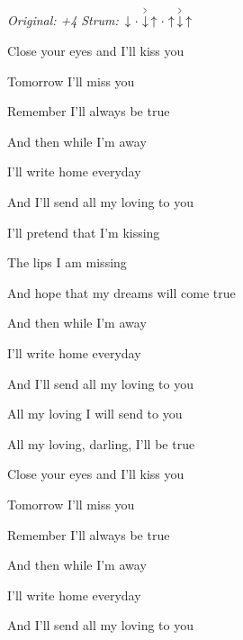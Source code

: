\begin{song}


\begin{headerbox}
\RaiseBoxWithAccents
\textit{Original: +4} \quad
\textit{Strum:} $\Down\Miss\AccentDown\Up\Miss\Up\AccentDown\Up$
\end{headerbox}

\begin{hchordbox}
\end{hchordbox}

\Large

\bigskip

Close your eyes and I'll kiss you \par
Tomorrow I'll miss you \par
Remember I'll always be true  \par
And then while I'm away \par
I'll write home everyday \par
And I'll send all my loving to you \par

\bigskip

I'll pretend that I'm kissing \par
The lips I am missing \par
And hope that my dreams will come true  \par
And then while I'm away \par
I'll write home everyday \par
And I'll send all my loving to you \par

\bigskip

All my loving I will send to you \par
All my loving, darling, I'll be true \par

\bigskip

Close your eyes and I'll kiss you \par
Tomorrow I'll miss you \par
Remember I'll always be true  \par
And then while I'm away \par
I'll write home everyday \par
And I'll send all my loving to you \par


\end{song}
